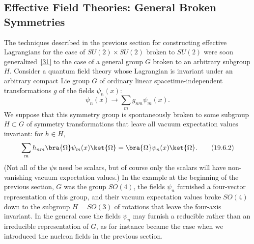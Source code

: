 
\subsection{Effective Field Theories: General Broken Symmetries}
\label{sec:19.6}

The techniques described in the previous section for constructing effective Lagrangians for the case of $SU(2)\times SU(2)$ broken to $SU(2)$ were soon generalized~\hyperref[ch19-ref-31]{[31]} to the case of a general group $G$ broken to an arbitrary subgroup $H$. Consider a quantum field theory whose Lagrangian is invariant under an arbitrary compact Lie group $G$ of ordinary linear spacetime-independent transformations $g$ of the fields $\psi_n(x)$:
\begin{equation}
\psi_n(x)\longrightarrow\sum_m g_{nm}\psi_m(x).
\tag{19.6.1}\label{eq:19.6.1}
\end{equation}
We suppose that this symmetry group is spontaneously broken to some subgroup $H\subset G$ of symmetry transformations that leave all vacuum expectation values invariant: for $h\in H$,
\begin{equation}
\sum_m h_{nm}\bra{\Omega}\psi_m(x)\ket{\Omega}
=\bra{\Omega}\psi_n(x)\ket{\Omega}.
\tag{19.6.2}\label{eq:19.6.2}
\end{equation}
(Not all of the $\psi$s need be scalars, but of course only the scalars will have non-vanishing vacuum expectation values.) In the example at the beginning of the previous section, $G$ was the group $SO(4)$, the fields $\psi_n$ furnished a four-vector representation of this group, and their vacuum expectation values broke $SO(4)$ down to the subgroup $H=SO(3)$ of rotations that leave the four-axis invariant. In the general case the fields $\psi_n$ may furnish a reducible rather than an irreducible representation of $G$, as for instance became the case when we introduced the nucleon fields in the previous section.

